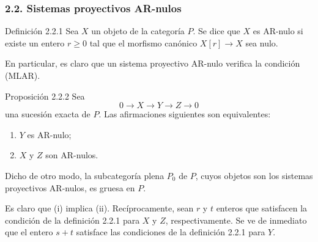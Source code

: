 \subsubsection*{2.2. Sistemas proyectivos AR-nulos}
\begin{statement}{Definición 2.2.1}
Sea $X$ un objeto de la categoría $P$. Se dice que $X$ es AR-nulo si existe un entero $r\ge0$ tal que el morfismo canónico $X[r]\to X$ sea nulo.
\end{statement}
En particular, es claro que un sistema proyectivo AR-nulo verifica la condición (MLAR).

\begin{statement}{Proposición 2.2.2}
Sea
\[
0\longrightarrow X\longrightarrow Y\longrightarrow Z\longrightarrow0
\]
una sucesión exacta de $P$. Las afirmaciones siguientes son equivalentes:
\begin{enumerate}[label=(\roman*)]
\item $Y$ es AR-nulo;
\item $X$ y $Z$ son AR-nulos.
\end{enumerate}
Dicho de otro modo, la subcategoría plena $P_0$ de $P$, cuyos objetos son los sistemas proyectivos AR-nulos, es gruesa en $P$.
\end{statement}

\begin{prooftext}[Demostración]
Es claro que (i) implica (ii). Recíprocamente, sean $r$ y $t$ enteros que satisfacen la condición de la definición 2.2.1 para $X$ y $Z$, respectivamente. Se ve de inmediato que el entero $s+t$ satisface las condiciones de la definición 2.2.1 para $Y$.
\end{prooftext}
